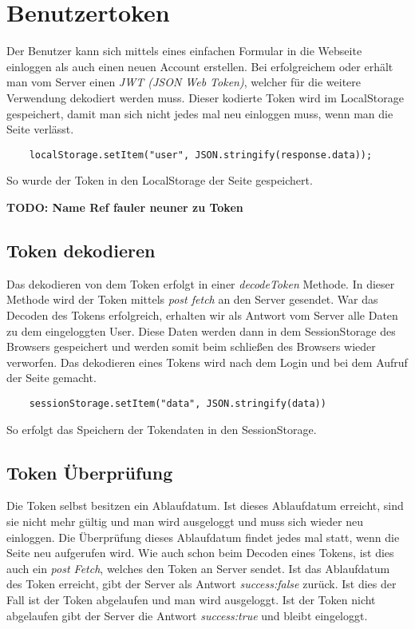 \section{Benutzertoken}
\label{benutzer}

Der Benutzer kann sich mittels eines einfachen Formular in die Webseite einloggen als auch einen neuen 
Account erstellen. Bei erfolgreichem  oder  erhält man vom Server einen 
\textit{JWT (JSON Web Token)}, welcher für die weitere Verwendung dekodiert werden muss. Dieser kodierte 
Token wird im LocalStorage gespeichert, damit man sich nicht jedes mal neu einloggen muss, wenn man 
die Seite verlässt.
\begin{lstlisting}
    localStorage.setItem("user", JSON.stringify(response.data));
\end{lstlisting}
So wurde der Token in den LocalStorage der Seite gespeichert.


\textbf{TODO: Name Ref fauler neuner zu Token}

\subsection{Token dekodieren}

Das dekodieren von dem Token erfolgt in einer \textit{decodeToken} Methode. In dieser Methode wird der 
Token mittels \textit{post fetch} an den Server gesendet. War das Decoden des Tokens erfolgreich, 
erhalten wir als Antwort vom Server alle Daten zu dem eingeloggten User. Diese Daten werden dann in 
dem SessionStorage des Browsers gespeichert und werden somit beim schließen des Browsers wieder verworfen. 
Das dekodieren eines Tokens wird nach dem Login und bei dem Aufruf der Seite gemacht.
\begin{lstlisting}
    sessionStorage.setItem("data", JSON.stringify(data))
\end{lstlisting}
So erfolgt das Speichern der Tokendaten in den SessionStorage.

\subsection{Token Überprüfung}

Die Token selbst besitzen ein Ablaufdatum. Ist dieses Ablaufdatum erreicht, sind sie nicht mehr 
gültig und man wird ausgeloggt und muss sich wieder neu einloggen. Die Überprüfung dieses Ablaufdatum 
findet jedes mal statt, wenn die Seite neu aufgerufen wird. Wie auch schon beim Decoden eines Tokens,
ist dies auch ein \textit{post Fetch}, welches den Token an Server sendet. Ist das Ablaufdatum des
Token erreicht, gibt der Server als Antwort \textit{success:false} zurück. Ist dies der Fall ist der 
Token abgelaufen und man wird ausgeloggt. Ist der Token nicht abgelaufen gibt der Server die Antwort 
\textit{success:true} und bleibt eingeloggt. 

